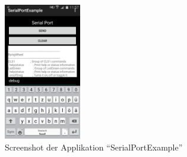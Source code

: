     \begin{figure}[h!]
    	\includegraphics[width=0.3\textwidth,clip,trim=0mm 0mm 0mm 0mm]
    	{Enddokumentation/Bilder/Screenshot_SerialPortExample_debug.png}
    	\centering
    	\caption{Screenshot der Applikation \enquote{SerialPortExample}}
    	\label{abb:ScreenshotSerialPortExampleTestProtokol}
    \end{figure}
    
